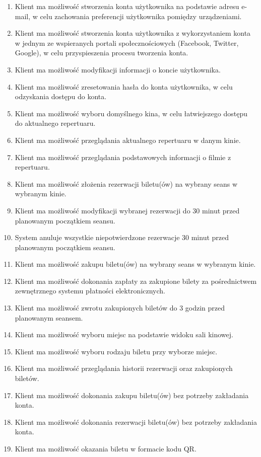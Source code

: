 \begin{enumerate}
\item Klient ma możliwość stworzenia konta użytkownika na podstawie adresu e-mail, w celu zachowania preferencji użytkownika pomiędzy urządzeniami.
\item Klient ma możliwość stworzenia konta użytkownika z wykorzystaniem konta w jednym ze wspieranych portali społecznościowych (Facebook, Twitter, Google), w celu przyspieszenia procesu tworzenia konta.
\item Klient ma możliwość modyfikacji informacji o koncie użytkownika.
\item Klient ma możliwość zresetowania hasła do konta użytkownika, w celu odzyskania dostępu do konta. 
\item Klient ma możliwość wyboru domyślnego kina, w celu łatwiejszego dostępu do aktualnego repertuaru.
\item Klient ma możliwość przeglądania aktualnego repertuaru w danym kinie.
\item Klient ma możliwość przeglądania podstawowych informacji o filmie z repertuaru. 
\item Klient ma możliwość złożenia rezerwacji biletu(ów) na wybrany seans w wybranym kinie.
\item Klient ma możliwość modyfikacji wybranej rezerwacji do 30 minut przed planowanym początkiem seansu.
\item System anuluje wszystkie niepotwierdzone rezerwacje 30 minut przed planowanym początkiem seansu. 
\item Klient ma możliwość zakupu biletu(ów) na wybrany seans w wybranym kinie.
\item Klient ma możliwość dokonania zapłaty za zakupione bilety za pośrednictwem zewnętrznego systemu płatności elektronicznych.
\item Klient ma możliwość zwrotu zakupionych biletów do 3 godzin przed planowanym seansem.
\item Klient ma możliwość wyboru miejsc na podstawie widoku sali kinowej.
\item Klient ma możliwość wyboru rodzaju biletu przy wyborze miejsc.
\item Klient ma możliwość przeglądania historii rezerwacji oraz zakupionych biletów.
\item Klient ma możliwość dokonania zakupu biletu(ów) bez potrzeby zakładania konta.
\item Klient ma możliwość dokonania rezerwacji biletu(ów) bez potrzeby zakładania konta. 
\item Klient ma możliwość okazania biletu w formacie kodu QR.

\end{enumerate}
